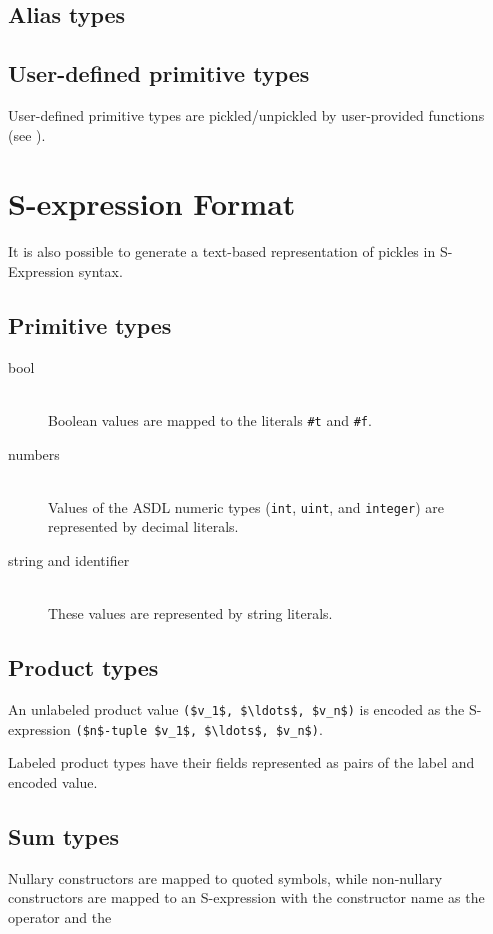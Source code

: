 \subsection{Alias types}

\subsection{User-defined primitive types}
User-defined primitive types are pickled/unpickled by user-provided functions (see
).

\section{S-expression Format}
It is also possible to generate a text-based representation of pickles in S-Expression
syntax.

\subsection{Primitive types}

\begin{description}
  \item[bool] \mbox{}\\
    Boolean values are mapped to the literals \lstinline!#t! and \lstinline!#f!.
    
  \item[numbers] \mbox{}\\
    Values of the ASDL numeric types (\lstinline!int!, \lstinline!uint!, and \lstinline!integer!)
    are represented by decimal literals.

  \item[string and identifier] \mbox{}\\
    These values are represented by string literals.
\end{description}%

\subsection{Product types}
An unlabeled product value \lstinline[mathescape=true]@($v_1$, $\ldots$, $v_n$)@ is encoded as the
S-expression \lstinline[mathescape=true]@($n$-tuple $v_1$, $\ldots$, $v_n$)@.

Labeled product types have their fields represented as pairs of the label and encoded value.

\subsection{Sum types}
Nullary constructors are mapped to quoted symbols, while non-nullary constructors are mapped
to an S-expression with the constructor name as the operator and the 

